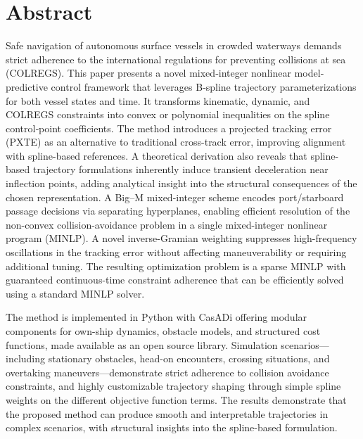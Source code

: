 
\pagestyle{fancy}
\fancyhf{}
\renewcommand{\chaptermark}[1]{\markboth{\chaptername\ \thechapter.\ #1}{}}
\renewcommand{\sectionmark}[1]{\markright{\thesection\ #1}}
\renewcommand{\headrulewidth}{0.1ex}
\renewcommand{\footrulewidth}{0.1ex}
\fancyfoot[LE,RO]{\thepage}
\fancypagestyle{plain}{\fancyhf{}\fancyfoot[LE,RO]{\thepage}\renewcommand{\headrulewidth}{0ex}}

\section*{\large Abstract}
\vspace{0.5cm}


Safe navigation of autonomous surface vessels in crowded waterways demands strict adherence to the international regulations for preventing collisions at sea (COLREGS). 
This paper presents a novel mixed‐integer nonlinear model‐predictive control framework that leverages B‐spline trajectory parameterizations for both vessel states and time. It transforms kinematic, dynamic, and COLREGS constraints into convex or polynomial inequalities on the spline control‐point coefficients.
The method introduces a projected tracking error (PXTE) as an alternative to traditional cross-track error, improving alignment with spline-based references. A theoretical derivation also reveals that spline-based trajectory formulations inherently induce transient deceleration near inflection points, adding analytical insight into the structural consequences of the chosen  representation.
A Big–M mixed-integer scheme encodes port/starboard passage decisions via separating hyperplanes, enabling efficient resolution of the non-convex collision-avoidance problem in a single mixed-integer nonlinear program (MINLP).
A novel inverse-Gramian weighting suppresses high-frequency oscillations in the tracking error without affecting maneuverability or requiring additional tuning. The resulting optimization problem is a sparse MINLP with guaranteed continuous-time constraint adherence that can be efficiently solved using a standard MINLP solver.

The method is implemented in Python with CasADi offering modular components for own-ship dynamics, obstacle models, and structured cost functions, made available as an open source library. Simulation scenarios---including stationary obstacles, head-on encounters, crossing situations, and overtaking maneuvers---demonstrate strict adherence to collision avoidance constraints, and highly customizable trajectory shaping through simple spline weights on the different objective function terms. The results demonstrate that the proposed method can produce smooth and interpretable 
trajectories in complex scenarios, with structural insights into the spline-based formulation.

